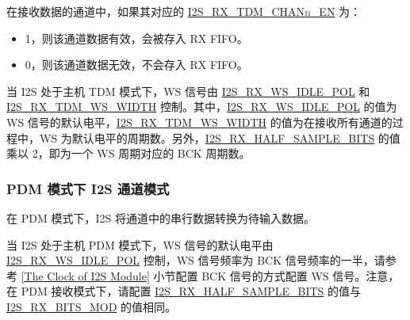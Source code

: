 \documentclass[main\_\_CN.tex]{subfiles}
\begin{document}
在接收数据的通道中，如果其对应的 \hyperref[fielddesc:I2STXTDMCHAN0EN]{I2S\_RX\_TDM\_CHAN{\textcolor{red}{n}}\_EN} 为：
\begin{itemize}
    \item 1，则该通道数据有效，会被存入 RX FIFO。
    \item 0，则该通道数据无效，不会存入 RX FIFO。
\end{itemize}
当 I2S 处于主机 TDM 模式下，WS 信号由 \hyperref[fielddesc:I2SRXWSIDLEPOL]{I2S\_RX\_WS\_IDLE\_POL} 和 \hyperref[fielddesc:I2SRXTDMWSWIDTH]{I2S\_RX\_TDM\_WS\_WIDTH} 控制。其中，\hyperref[fielddesc:I2SRXWSIDLEPOL]{I2S\_RX\_WS\_IDLE\_POL} 的值为 WS 信号的默认电平，\hyperref[fielddesc:I2SRXTDMWSWIDTH]{I2S\_RX\_TDM\_WS\_WIDTH} 的值为在接收所有通道的过程中，WS 为默认电平的周期数。另外，\hyperref[fielddesc:I2SRXHALFSAMPLEBITS]{I2S\_RX\_HALF\_SAMPLE\_BITS} 的值乘以 2，即为一个 WS 周期对应的 BCK 周期数。


\subsubsection{PDM 模式下 I2S 通道模式}
在 PDM 模式下，I2S 将通道中的串行数据转换为待输入数据。

当 I2S 处于主机 PDM 模式下，WS 信号的默认电平由 \hyperref[fielddesc:I2SRXWSIDLEPOL]{I2S\_RX\_WS\_IDLE\_POL} 控制，WS 信号频率为 BCK 信号频率的一半，请参考 \ref{The Clock of I2S Module} 小节配置 BCK 信号的方式配置 WS 信号。注意，在 PDM 接收模式下，请配置 \hyperref[fielddesc:I2SRXHALFSAMPLEBITS]{I2S\_RX\_HALF\_SAMPLE\_BITS} 的值与 \hyperref[fielddesc:I2SRXBITSMOD]{I2S\_RX\_BITS\_MOD} 的值相同。
\end{document}
